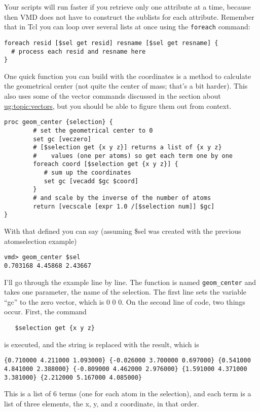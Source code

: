Your scripts will run faster if you retrieve only one attribute at a time,
because then VMD does not have to construct the sublists for each 
attribute.  Remember that in Tcl you can loop over several lists at once
using the {\tt foreach} command:
\begin{verbatim}
foreach resid [$sel get resid] resname [$sel get resname] {
  # process each resid and resname here
}
\end{verbatim}

One quick function you can build with the coordinates is a method to
calculate the geometrical center (not quite the center of mass; that's a
bit harder). This also uses some of the vector commands discussed in
the section about \hyperref{vectors and matrices}{vectors and matrices [\S}{]}
{ug:topic:vectors}, but you should be
able to figure them out from context.
\begin{verbatim}
proc geom_center {selection} {
        # set the geometrical center to 0
        set gc [veczero]
        # [$selection get {x y z}] returns a list of {x y z} 
        #    values (one per atoms) so get each term one by one
        foreach coord [$selection get {x y z}] {
           # sum up the coordinates
           set gc [vecadd $gc $coord]
        }
        # and scale by the inverse of the number of atoms
        return [vecscale [expr 1.0 /[$selection num]] $gc]
}
\end{verbatim}

With that defined you can say (assuming \$sel was created with the
previous atomselection example)
\begin{verbatim}
vmd> geom_center $sel
0.703168 4.45868 2.43667
\end{verbatim}
I'll go through the example line by line.  The function is named 
{\tt geom\_center} and takes one parameter, the name of the selection.
The first line sets the variable ``gc'' to the zero vector, which is {0
0 0}.  On the second line of code, two things occur.  First, the command
\begin{verbatim}
   $selection get {x y z}
\end{verbatim}
is executed, and the string is replaced with the result, which is
\begin{verbatim}
{0.710000 4.211000 1.093000} {-0.026000 3.700000 0.697000} {0.541000
4.841000 2.388000} {-0.809000 4.462000 2.976000} {1.591000 4.371000
3.381000} {2.212000 5.167000 4.085000}
\end{verbatim}
This is a list of 6 terms (one for each atom in the selection), and
each term is a list of three elements, the x, y, and z coordinate, in
that order.

